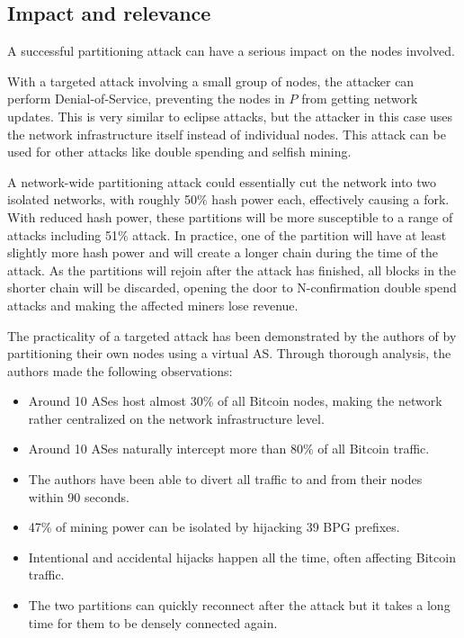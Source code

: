 \documentclass[12pt]{article}
\begin{document}
\subsection{Impact and relevance}

A successful partitioning attack can have a serious impact on the nodes involved.

With a targeted attack involving a small group of nodes, the attacker can perform Denial-of-Service, preventing the nodes in $P$ from getting network updates. This is very similar to eclipse attacks, but the attacker in this case uses the network infrastructure itself instead of individual nodes. This attack can be used for other attacks like double spending and selfish mining.

A network-wide partitioning attack could essentially cut the network into two isolated networks, with roughly 50\% hash power each, effectively causing a fork. With reduced hash power, these partitions will be more susceptible to a range of attacks including 51\% attack. In practice, one of the partition will have at least slightly more hash power and will create a longer chain during the time of the attack. As the partitions will rejoin after the attack has finished, all blocks in the shorter chain will be discarded, opening the door to N-confirmation double spend attacks and making the affected miners lose revenue.

The practicality of a targeted attack has been demonstrated by the authors of \cite{RoutingAttacks} by partitioning their own nodes using a virtual AS. Through thorough analysis, the authors made the following observations:

\begin{itemize}
    \item Around 10 ASes host almost 30\% of all Bitcoin nodes, making the network rather centralized on the network infrastructure level.
    \item Around 10 ASes naturally intercept more than 80\% of all Bitcoin traffic.
    \item The authors have been able to divert all traffic to and from their nodes within 90 seconds.
    \item 47\% of mining power can be isolated by hijacking 39 BPG prefixes.
    \item Intentional and accidental hijacks happen all the time, often affecting Bitcoin traffic.
    \item The two partitions can quickly reconnect after the attack but it takes a long time for them to be densely connected again.
\end{itemize}
\end{document}
